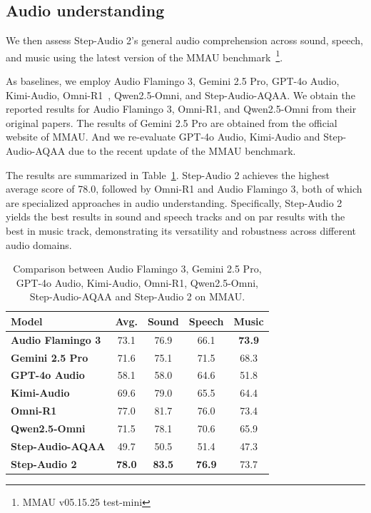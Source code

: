 \subsection{Audio understanding}

We then assess Step-Audio 2's general audio comprehension across sound, speech, and music using the latest version of the MMAU  benchmark~\cite{sakshi2024mmau}\footnote{MMAU v05.15.25 test-mini}.

As baselines, we employ Audio Flamingo 3, Gemini 2.5 Pro, GPT-4o Audio, Kimi-Audio, Omni-R1~\cite{rouditchenko2025omni}, Qwen2.5-Omni, and Step-Audio-AQAA. We obtain the reported results for Audio Flamingo 3, Omni-R1, and Qwen2.5-Omni from their original papers. The results of Gemini 2.5 Pro are obtained from the official website of MMAU.
And we re-evaluate GPT-4o Audio, Kimi-Audio and Step-Audio-AQAA due to the recent update of the MMAU benchmark.

The results are summarized in Table~\ref{tab:MMAU}. Step-Audio 2 achieves the highest average score of 78.0, followed by Omni-R1 and Audio Flamingo 3, both of which are specialized approaches in audio understanding.
Specifically, Step-Audio 2 yields the best results in sound and speech tracks and on par results with the best in music track, demonstrating its versatility and robustness across different audio domains.


\begin{table}[htb]
\caption{Comparison between Audio Flamingo 3, Gemini 2.5 Pro, GPT-4o Audio, Kimi-Audio, Omni-R1, Qwen2.5-Omni, Step-Audio-AQAA and Step-Audio 2 on MMAU.}
\label{tab:MMAU}
\centering
\begin{tabular}{lcccc}
\toprule
\textbf{Model}& \textbf{Avg.} & \textbf{Sound} & \textbf{Speech} & \textbf{Music}  \\
\midrule
\textbf{Audio Flamingo 3} &73.1 & 76.9& 66.1& \textbf{73.9}\\
\textbf{Gemini 2.5 Pro} & 71.6  & 75.1& 71.5 &68.3\\
\textbf{GPT-4o Audio} & 58.1 & 58.0& 64.6 &51.8\\
\textbf{Kimi-Audio} & 69.6& 79.0& 65.5&64.4\\
\textbf{Omni-R1}&77.0 & 81.7& 76.0&73.4\\
\textbf{Qwen2.5-Omni} &71.5 & 78.1& 70.6&65.9\\
\textbf{Step-Audio-AQAA} & 49.7 &  50.5&  51.4& 47.3\\
\textbf{Step-Audio 2} & \textbf{78.0} & \textbf{83.5} & \textbf{76.9} & 73.7\\
\bottomrule
\end{tabular}
\end{table}



